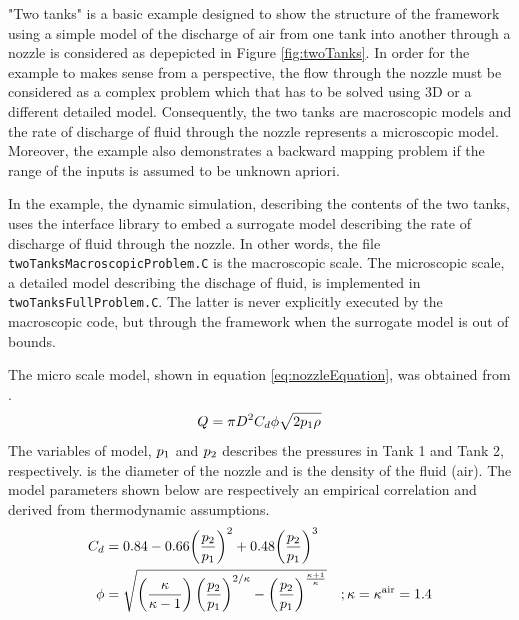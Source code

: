 "Two tanks" is a basic example designed to show the structure of the framework using a simple model of the discharge of air from one tank into another through a nozzle is considered as depepicted in Figure \ref{fig:twoTanks}. 
In order for the example to makes sense from a {\MoDeNa} perspective, the flow through the nozzle must be considered as a complex problem which that has to be solved using 3D {\ComputationalFluidDynamics} or a different detailed model. 
Consequently, the two tanks are macroscopic models and the rate of discharge of fluid through the nozzle represents a microscopic model. 
Moreover, the example also demonstrates a backward mapping problem if the range of the inputs is assumed to be unknown apriori. 
%
\par
%
In the example, the dynamic simulation, describing the contents of the two tanks, uses the {\MoDeNa} interface library to embed a surrogate model describing the rate of discharge of fluid through the nozzle. 
In other words, the file \texttt{twoTanksMacroscopicProblem.C} is the macroscopic scale. 
The microscopic scale, a detailed model describing the dischage of fluid, is implemented in \texttt{twoTanksFullProblem.C}. 
The latter is never explicitly executed by the macroscopic code, but through the {\MoDeNa} framework when the surrogate model is out of bounds. 
%
\par
%
The micro scale model, shown in equation \ref{eq:nozzleEquation}, was obtained from \cite{VDI}.
\begin{equation}
    Q = \pi D^2 C_d \phi \sqrt{ 2 p_1 \rho_{}} \label{eq:nozzleEquation}
\end{equation}
The variables of model, $p_1$ and $p_2$ describes the pressures in Tank 1 and Tank 2, respectively. 
{\Diameter} is the diameter of the nozzle and {\Density{}} is the density of the fluid (air).
The model parameters shown below are respectively an empirical correlation and derived from thermodynamic assumptions.
\begin{align*}
C_d &= 0.84-
      0.66 \displaystyle{ \left( \frac{\ensuremath{p}_2}{\ensuremath{p}_1} \right) }^2 +
      0.48 \displaystyle{ \left( \frac{\ensuremath{p}_2}{\ensuremath{p}_1} \right) }^3 \\
\phi &= 
      \sqrt{\displaystyle\left(
                             \frac{\kappa}{\kappa-1}
                         \right)
            \displaystyle{\left(
                             \frac{\ensuremath{p}_2}{\ensuremath{p}_1}
                         \right)}^{2/\kappa} -
            \displaystyle{\left(
                             \frac{\ensuremath{p}_2}{\ensuremath{p}_1}
                          \right)}^{\frac{\kappa +1 }{\kappa}}} 
     &; \kappa = \kappa^{\text{air}} = 1.4
\end{align*}
